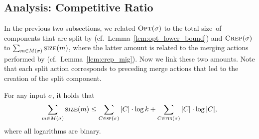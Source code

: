 
\subsection{Analysis: Competitive Ratio}
\label{sec:crep_ratio}

In the previous two subsections, we related $\textsc{Opt}(\sigma)$ to the total
size~of components that are split by \CREP
(cf.~Lemma~\ref{lem:opt_lower_bound}) and $\textsc{Crep}(\sigma)$ to $\sum_{m \in
M(\sigma)} \textsc{size}(m)$, where the latter amount is related to the merging
actions performed by \CREP (cf.~Lemma~\ref{lem:crep_mig}). Now we link
these two amounts. Note that each split action corresponds to preceding
merge actions that led to the creation of the split component.

\begin{lemma}
\label{lem:bounding_merges}
For any input $\sigma$, it holds that 
\[
\sum_{m \in M(\sigma)} \textsc{size}(m) 
	\leq \sum_{C \in \textsc{sp}(\sigma)} |C| \cdot \log k +
	\sum_{C \in \textsc{fin}(\sigma)} |C| \cdot \log |C|,
        \]
where all logarithms are binary.
\end{lemma}

